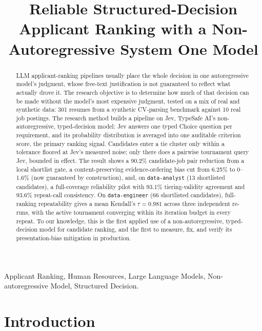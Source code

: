 \documentclass[journal]{IEEEtran}
\begin{document}
\title{Reliable Structured-Decision Applicant Ranking with a Non-Autoregressive System One Model}

\maketitle

\begin{abstract}
LLM applicant-ranking pipelines usually place the whole decision in one autoregressive model's judgment, whose free-text justification is not guaranteed to reflect what actually drove it. The research objective is to determine how much of that decision can be made without the model's most expensive judgment, tested on a mix of real and synthetic data: 301 resumes from a synthetic CV-parsing benchmark against 10 real job postings. The research method builds a pipeline on Jev, TypeSafe AI's non-autoregressive, typed-decision model: Jev answers one typed Choice question per requirement, and its probability distribution is averaged into one auditable criterion score, the primary ranking signal. Candidates enter a tie cluster only within a tolerance floored at Jev's measured noise; only there does a pairwise tournament query Jev, bounded in effect. The result shows a 90.2\% candidate-job pair reduction from a local shortlist gate, a content-preserving evidence-ordering bias cut from 6.25\% to 0--1.6\% (now guaranteed by construction), and, on \texttt{data-analyst} (13 shortlisted candidates), a full-coverage reliability pilot with 93.1\% tiering-validity agreement and 93.6\% repeat-call consistency. On \texttt{data-engineer} (66 shortlisted candidates), full-ranking repeatability gives a mean Kendall's $\tau=0.981$ across three independent re-runs, with the active tournament converging within its iteration budget in every repeat. To our knowledge, this is the first applied use of a non-autoregressive, typed-decision model for candidate ranking, and the first to measure, fix, and verify its presentation-bias mitigation in production.
\end{abstract}

\begin{IEEEkeywords}
Applicant Ranking, Human Resources, Large Language Models, Non-autoregressive Model, Structured Decision.
\end{IEEEkeywords}

\IEEEpeerreviewmaketitle

\section{Introduction}
\end{document}

